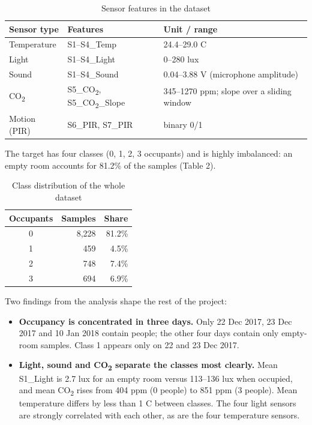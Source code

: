 \documentclass[12pt,a4paper]{article}
\begin{document}
\begin{table}[H]
\centering
\begin{tabular}{lll}
\toprule
\textbf{Sensor type} & \textbf{Features} & \textbf{Unit / range} \\
\midrule
Temperature & S1--S4\_Temp & 24.4--29.0 \textdegree{}C \\
Light & S1--S4\_Light & 0--280 lux \\
Sound & S1--S4\_Sound & 0.04--3.88 V (microphone amplitude) \\
CO\textsubscript{2} & S5\_CO\textsubscript{2}, S5\_CO\textsubscript{2}\_Slope & 345--1270 ppm; slope over a sliding window \\
Motion (PIR) & S6\_PIR, S7\_PIR & binary 0/1 \\
\bottomrule
\end{tabular}
\caption{Sensor features in the dataset}
\end{table}

The target has four classes (0, 1, 2, 3 occupants) and is highly imbalanced: an empty room accounts for 81.2\% of the samples (Table 2).

\begin{table}[H]
\centering
\begin{tabular}{crr}
\toprule
\textbf{Occupants} & \textbf{Samples} & \textbf{Share} \\
\midrule
0 & 8,228 & 81.2\% \\
1 & 459 & 4.5\% \\
2 & 748 & 7.4\% \\
3 & 694 & 6.9\% \\
\bottomrule
\end{tabular}
\caption{Class distribution of the whole dataset}
\end{table}

Two findings from the analysis shape the rest of the project:

\begin{itemize}
  \item \textbf{Occupancy is concentrated in three days.} Only 22 Dec 2017, 23 Dec 2017 and 10 Jan 2018 contain people; the other four days contain only empty-room samples. Class 1 appears only on 22 and 23 Dec 2017.
  \item \textbf{Light, sound and CO\textsubscript{2} separate the classes most clearly.} Mean S1\_Light is 2.7 lux for an empty room versus 113--136 lux when occupied, and mean CO\textsubscript{2} rises from 404 ppm (0 people) to 851 ppm (3 people). Mean temperature differs by less than 1 \textdegree{}C between classes. The four light sensors are strongly correlated with each other, as are the four temperature sensors.
\end{itemize}
\end{document}
